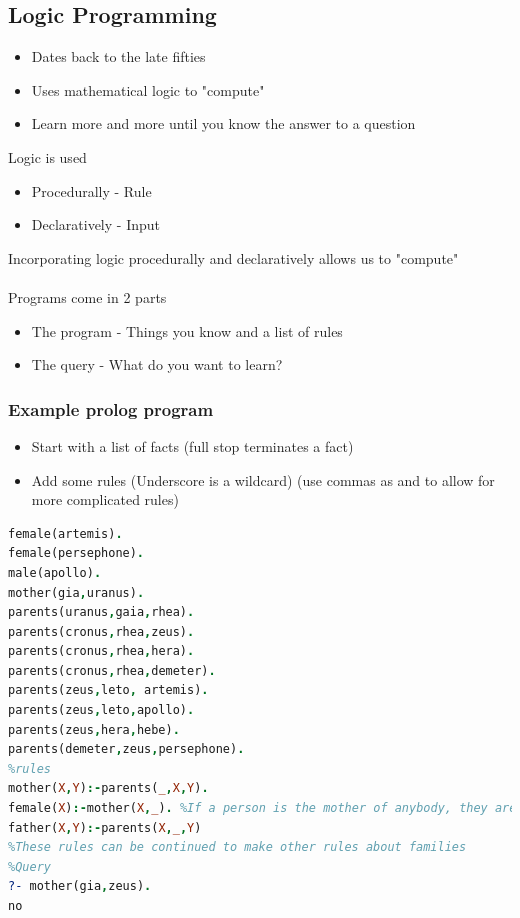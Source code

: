 \documentclass{article}[18pt]
\begin{document}
\subsection{Logic Programming}
\begin{itemize}
\item Dates back to the late fifties
\item Uses mathematical logic to "compute"
\item Learn more and more until you know the answer to a question
\end{itemize}
Logic is used
\begin{itemize}
\item Procedurally - Rule
\item Declaratively  - Input
\end{itemize}
Incorporating logic procedurally and declaratively allows us to "compute"\\
\\
Programs come in 2 parts
\begin{itemize}
\item The program - Things you know and a list of rules
\item The query - What do you want to learn?
\end{itemize}
\subsubsection{Example prolog program}
\begin{itemize}
\item Start with a list of facts (full stop terminates a fact)
\item Add some rules (Underscore is a wildcard) (use commas as and to allow for more complicated rules)
\end{itemize}
\begin{lstlisting}[mathescape=true,language=Prolog]
female(artemis).
female(persephone).
male(apollo).
mother(gia,uranus).
parents(uranus,gaia,rhea).
parents(cronus,rhea,zeus).
parents(cronus,rhea,hera).
parents(cronus,rhea,demeter).
parents(zeus,leto, artemis).
parents(zeus,leto,apollo).
parents(zeus,hera,hebe).
parents(demeter,zeus,persephone).
%rules
mother(X,Y):-parents(_,X,Y).
female(X):-mother(X,_). %If a person is the mother of anybody, they are female
father(X,Y):-parents(X,_,Y)
%These rules can be continued to make other rules about families
%Query
?- mother(gia,zeus).
no
\end{lstlisting}
\end{document}
